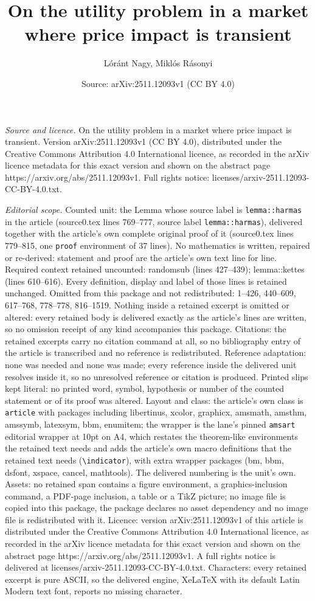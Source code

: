 \documentclass[10pt,a4paper]{amsart}
\title[On the utility problem in a market where price impact is tra]{On the utility problem in a market where price impact is transient}
\author{L\'or\'ant Nagy, Mikl\'os R\'asonyi}
\date{Source: arXiv:2511.12093v1 (CC BY 4.0)}
\begin{document}
\maketitle

\noindent\emph{Source and licence.} On the utility problem in a market where price impact is transient. Version arXiv:2511.12093v1 (CC BY 4.0), distributed under the Creative Commons Attribution 4.0 International licence, as recorded in the arXiv licence metadata for this exact version and shown on the abstract page https://arxiv.org/abs/2511.12093v1. Full rights notice: licenses/arxiv-2511.12093-CC-BY-4.0.txt.\par\smallskip

\noindent\textit{Editorial scope.} Counted unit: the Lemma whose source label is \texttt{lemma::harmas} in the article (source0.tex lines 769--777, source label \texttt{lemma::harmas}), delivered together with the article's own complete original proof of it (source0.tex lines 779--815, one \texttt{proof} environment of 37 lines). No mathematics is written, repaired or re-derived: statement and proof are the article's own text line for line. Required context retained uncounted: randomsub (lines 427--439); lemma::kettes (lines 610--616). Every definition, display and label of those lines is retained unchanged. Omitted from this package and not redistributed: 1--426, 440--609, 617--768, 778--778, 816--1519. Nothing inside a retained excerpt is omitted or altered: every retained body is delivered exactly as the article's lines are written, so no omission receipt of any kind accompanies this package. Citations: the retained excerpts carry no citation command at all, so no bibliography entry of the article is transcribed and no reference is redistributed. Reference adaptation: none was needed and none was made; every reference inside the delivered unit resolves inside it, so no unresolved reference or citation is produced. Printed slips kept literal: no printed word, symbol, hypothesis or number of the counted statement or of its proof was altered. Layout and class: the article's own class is \texttt{article} with packages including libertinus, xcolor, graphicx, amsmath, amsthm, amssymb, latexsym, bbm, enumitem; the wrapper is the lane's pinned \texttt{amsart} editorial wrapper at 10pt on A4, which restates the theorem-like environments the retained text needs and adds the article's own macro definitions that the retained text needs (\texttt{\textbackslash indicator}), with extra wrapper packages (bm, bbm, dsfont, xspace, cancel, mathtools). The delivered numbering is the unit's own. Assets: no retained span contains a figure environment, a graphics-inclusion command, a PDF-page inclusion, a table or a TikZ picture; no image file is copied into this package, the package declares no asset dependency and no image file is redistributed with it. Licence: version arXiv:2511.12093v1 of this article is distributed under the Creative Commons Attribution 4.0 International licence, as recorded in the arXiv licence metadata for this exact version and shown on the abstract page https://arxiv.org/abs/2511.12093v1. A full rights notice is delivered at licenses/arxiv-2511.12093-CC-BY-4.0.txt. Characters: every retained excerpt is pure ASCII, so the delivered engine, XeLaTeX with its default Latin Modern text font, reports no missing character.
\end{document}
